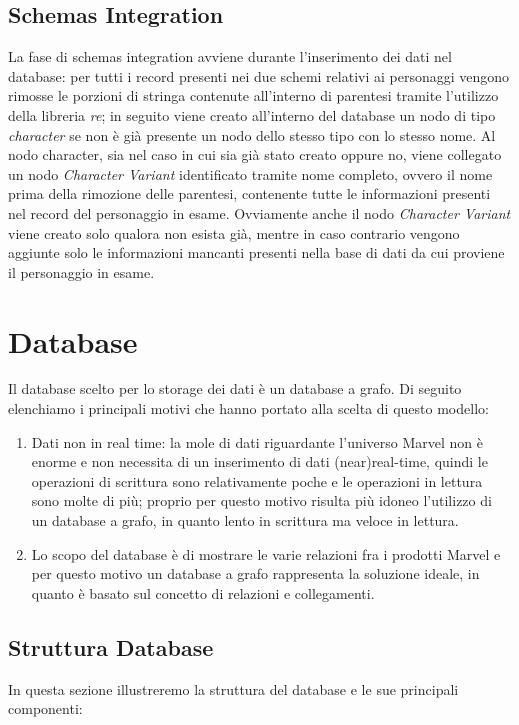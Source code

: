 \documentclass[
12pt, %
a4paper, %
oneside, %
headinclude,footinclude, %
BCOR5mm, %
]{scrartcl}
\begin{document}
\subsection{Schemas Integration}
La fase di schemas integration avviene durante l'inserimento dei dati nel database: per tutti i record presenti nei due schemi relativi ai personaggi vengono rimosse le porzioni di stringa contenute all'interno di parentesi tramite l'utilizzo della libreria \textit{re}; in seguito viene creato all'interno del database un nodo di tipo \textit{character} se non è già presente un nodo dello stesso tipo con lo stesso nome.
Al nodo character, sia nel caso in cui sia già stato creato oppure no, viene collegato un nodo \textit{Character Variant} identificato tramite nome completo, ovvero il nome prima della rimozione delle parentesi, contenente tutte le informazioni presenti nel record del personaggio in esame. Ovviamente anche il nodo \textit{Character Variant} viene creato solo qualora non esista già, mentre in caso contrario vengono aggiunte solo le informazioni mancanti presenti nella base di dati da cui proviene il personaggio in esame.
\section{Database}
Il database scelto per lo storage dei dati è un database a grafo. Di seguito elenchiamo i principali motivi che hanno portato alla scelta di questo modello:
\begin{enumerate}
	\item Dati non in real time: la mole di dati riguardante l'universo Marvel non è enorme e non necessita di un inserimento di dati (near)real-time, quindi le operazioni di scrittura sono relativamente poche e le operazioni in lettura sono molte di più; proprio per questo motivo risulta più idoneo l'utilizzo di un database a grafo, in quanto lento in scrittura ma veloce in lettura.
	\item Lo scopo del database è di mostrare le varie relazioni fra i prodotti Marvel e per questo motivo un database a grafo rappresenta la soluzione ideale, in quanto è basato sul concetto di relazioni e collegamenti.
\end{enumerate}
\subsection{Struttura Database}
In questa sezione illustreremo la struttura del database e le sue principali componenti:
\end{document}
